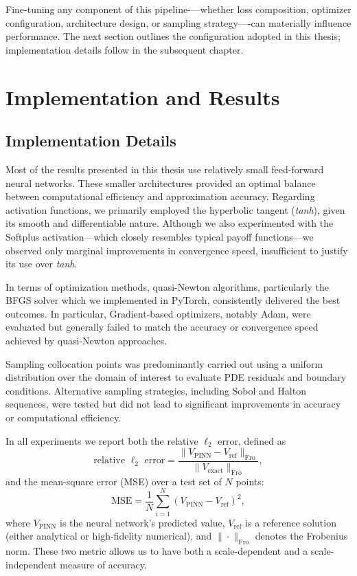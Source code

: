 \documentclass[12pt]{report} %
\theoremstyle{plain} %
\theoremstyle{definition} %
\theoremstyle{remark} %
\begin{document}
Fine-tuning any component of this pipeline-—whether loss composition, optimizer configuration, architecture design, 
or sampling strategy—-can materially influence performance. The next section outlines the configuration adopted in 
this thesis; implementation details follow in the subsequent chapter.

\chapter{Implementation and Results}

\section{Implementation Details}

Most of the results presented in this thesis use relatively small feed-forward neural networks. These smaller 
architectures provided an optimal balance between computational efficiency and approximation accuracy. 
Regarding activation functions, we primarily employed the hyperbolic tangent (\emph{tanh}), given its smooth and differentiable nature. 
Although we also experimented with the Softplus activation—which closely resembles typical payoff functions—we observed only marginal 
improvements in convergence speed, insufficient to justify its use over \emph{tanh}.

In terms of optimization methods, quasi-Newton algorithms, particularly the BFGS solver which 
we implemented in PyTorch, consistently delivered the best outcomes. In particular, Gradient-based 
optimizers, notably Adam, were evaluated but generally failed to match the 
accuracy or convergence speed achieved by quasi-Newton approaches.

Sampling collocation points was predominantly carried out using a uniform distribution over the domain of interest to evaluate 
PDE residuals and boundary conditions. Alternative sampling strategies, including Sobol and Halton sequences, were tested but 
did not lead to significant improvements in accuracy or computational efficiency.

In all experiments we report both the relative \(\ell_2\) error, defined as
\[ \text{relative }\ell_2\text{ error} = \frac{\|V_{\text{PINN}}- V_{\text{ref}}\|_{\text{Fro}}}{\|V_{\text{exact}}\|_{\text{Fro}}}, \]
and the mean-square error (MSE) over a test set of \(N\) points:
\[ \text{MSE} = \frac{1}{N}\sum_{i=1}^{N} \left(V_{\text{PINN}} - V_{\text{ref}}\right)^2, \]
where \(V_{\text{PINN}}\) is the neural network's predicted value, \(V_{\text{ref}}\) is a reference solution (either analytical or high-fidelity numerical),
and \(\|\cdot\|_{\text{Fro}}\) denotes the Frobenius norm. These two metric allows us to have both a scale-dependent and a scale-independent measure of accuracy.
\end{document}

